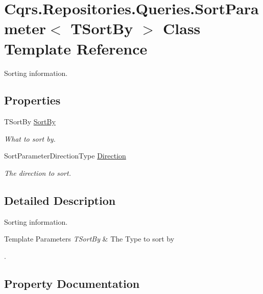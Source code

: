 \hypertarget{classCqrs_1_1Repositories_1_1Queries_1_1SortParameter}{}\section{Cqrs.\+Repositories.\+Queries.\+Sort\+Parameter$<$ T\+Sort\+By $>$ Class Template Reference}
\label{classCqrs_1_1Repositories_1_1Queries_1_1SortParameter}


Sorting information.  


\subsection*{Properties}
\begin{DoxyCompactItemize}
\item 
T\+Sort\+By \hyperlink{classCqrs_1_1Repositories_1_1Queries_1_1SortParameter_adcd8ebe48bfc697ada8b302d5acb3d00_adcd8ebe48bfc697ada8b302d5acb3d00}{Sort\+By}
\begin{DoxyCompactList}\small\item\em What to sort by. \end{DoxyCompactList}\item 
Sort\+Parameter\+Direction\+Type \hyperlink{classCqrs_1_1Repositories_1_1Queries_1_1SortParameter_abbe43d8ab36bb92bc388ad72651db73f_abbe43d8ab36bb92bc388ad72651db73f}{Direction}
\begin{DoxyCompactList}\small\item\em The direction to sort. \end{DoxyCompactList}\end{DoxyCompactItemize}


\subsection{Detailed Description}
Sorting information. 


\begin{DoxyTemplParams}{Template Parameters}
{\em T\+Sort\+By} & The Type to sort by\\
\hline
\end{DoxyTemplParams}
. 

\subsection{Property Documentation}
\mbox{\label{classCqrs_1_1Repositories_1_1Queries_1_1SortParameter_abbe43d8ab36bb92bc388ad72651db73f_abbe43d8ab36bb92bc388ad72651db73f}} 
